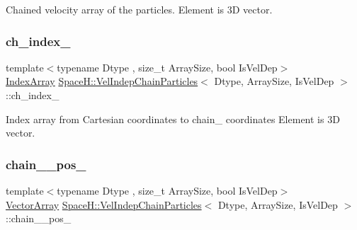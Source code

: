 Chained velocity array of the particles. Element is 3D vector. 

\mbox{\label{class_space_h_1_1_vel_indep_chain_particles_a4801898e53bf6ece4ed588e03646b8a8}} 
\subsubsection{\texorpdfstring{ch\+\_\+index\+\_\+}{ch\_index\_}}
{\footnotesize\ttfamily template$<$typename Dtype , size\+\_\+t Array\+Size, bool Is\+Vel\+Dep$>$ \\
\mbox{\hyperlink{class_space_h_1_1_vel_indep_chain_particles_a48b9183f8d68fe8af42bf405125d450c}{Index\+Array}} \mbox{\hyperlink{class_space_h_1_1_vel_indep_chain_particles}{Space\+H\+::\+Vel\+Indep\+Chain\+Particles}}$<$ Dtype, Array\+Size, Is\+Vel\+Dep $>$\+::ch\+\_\+index\+\_\+\hspace{0.3cm}{\ttfamily [protected]}}



Index array from Cartesian coordinates to chain_ coordinates Element is 3D vector.

\mbox{\label{class_space_h_1_1_vel_indep_chain_particles_a6426404ff1098f28e34b9867c3b64e0c}} 
\subsubsection{\texorpdfstring{chain_\+\_\+pos\+\_\+}{chain_\_pos\_}}
{\footnotesize\ttfamily template$<$typename Dtype , size\+\_\+t Array\+Size, bool Is\+Vel\+Dep$>$ \\
\mbox{\hyperlink{class_space_h_1_1_vel_indep_particles_aa9983058940249df8b00fa800e8cbad2}{Vector\+Array}} \mbox{\hyperlink{class_space_h_1_1_vel_indep_chain_particles}{Space\+H\+::\+Vel\+Indep\+Chain\+Particles}}$<$ Dtype, Array\+Size, Is\+Vel\+Dep $>$\+::chain_\+\_\+pos\+\_\+\hspace{0.3cm}{\ttfamily [protected]}}



